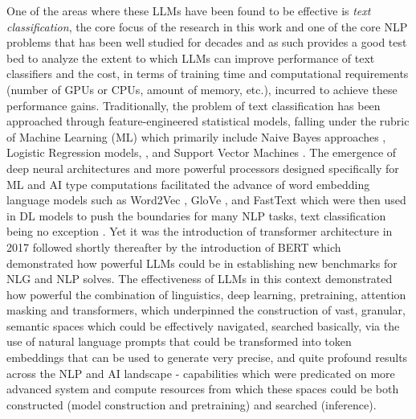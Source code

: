 \documentclass[final]{clv2025}
\begin{document}
One of the areas where these LLMs have been found to be effective is \textit{text classification}, the core focus of the research in this work and one of the core NLP problems that has been well studied for decades and as such provides a good test bed to analyze the extent to which LLMs can improve performance of text classifiers and the cost, in terms of training time and computational requirements (number of GPUs or CPUs, amount of memory, etc.), incurred to achieve these performance gains. Traditionally, the problem of text classification has been approached through feature-engineered statistical models, falling under the rubric of Machine Learning (ML) which primarily include Naive Bayes approaches \cite{mccallum1998comparison}, Logistic Regression models, \cite{genkin01082007}, and Support Vector Machines \cite{joachims1998text}. The emergence of deep neural architectures and more powerful processors designed specifically for ML and AI type computations facilitated the advance of word embedding language models such as Word2Vec \cite{mikolov}, GloVe \cite{pennington}, and FastText \cite{articleboja} which were then used in DL models to push the boundaries for many NLP tasks, text classification being no exception \cite{zhang2015character} \cite{yoon2014convolutional} \cite{hochreiterlong}. Yet it was the introduction of transformer architecture in 2017 \cite{vaswani} followed shortly thereafter by the introduction of BERT \cite{devlin-etal-2019-bert} which demonstrated how powerful LLMs could be in establishing new benchmarks for NLG and NLP solves. The effectiveness of LLMs in this context demonstrated how powerful the combination of linguistics, deep learning, pretraining, attention masking and transformers, which underpinned the construction of vast, granular, semantic spaces which could be effectively navigated, searched basically, via the use of natural language prompts that could be transformed into token embeddings that can be used to generate very precise, and quite profound results across the NLP and AI landscape - capabilities which were predicated on  more advanced system and compute resources from which these spaces could be both constructed (model construction and pretraining) and searched (inference). 
\end{document}

